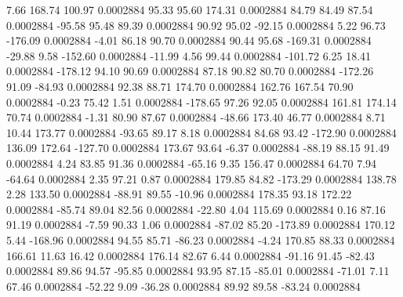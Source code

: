         7.66      168.74      100.97     0.0002884
       95.33       95.60      174.31     0.0002884
       84.79       84.49       87.54     0.0002884
      -95.58       95.48       89.39     0.0002884
       90.92       95.02      -92.15     0.0002884
        5.22       96.73     -176.09     0.0002884
       -4.01       86.18       90.70     0.0002884
       90.44       95.68     -169.31     0.0002884
      -29.88        9.58     -152.60     0.0002884
      -11.99        4.56       99.44     0.0002884
     -101.72        6.25       18.41     0.0002884
     -178.12       94.10       90.69     0.0002884
       87.18       90.82       80.70     0.0002884
     -172.26       91.09      -84.93     0.0002884
       92.38       88.71      174.70     0.0002884
      162.76      167.54       70.90     0.0002884
       -0.23       75.42        1.51     0.0002884
     -178.65       97.26       92.05     0.0002884
      161.81      174.14       70.74     0.0002884
       -1.31       80.90       87.67     0.0002884
      -48.66      173.40       46.77     0.0002884
        8.71       10.44      173.77     0.0002884
      -93.65       89.17        8.18     0.0002884
       84.68       93.42     -172.90     0.0002884
      136.09      172.64     -127.70     0.0002884
      173.67       93.64       -6.37     0.0002884
      -88.19       88.15       91.49     0.0002884
        4.24       83.85       91.36     0.0002884
      -65.16        9.35      156.47     0.0002884
       64.70        7.94      -64.64     0.0002884
        2.35       97.21        0.87     0.0002884
      179.85       84.82     -173.29     0.0002884
      138.78        2.28      133.50     0.0002884
      -88.91       89.55      -10.96     0.0002884
      178.35       93.18      172.22     0.0002884
      -85.74       89.04       82.56     0.0002884
      -22.80        4.04      115.69     0.0002884
        0.16       87.16       91.19     0.0002884
       -7.59       90.33        1.06     0.0002884
      -87.02       85.20     -173.89     0.0002884
      170.12        5.44     -168.96     0.0002884
       94.55       85.71      -86.23     0.0002884
       -4.24      170.85       88.33     0.0002884
      166.61       11.63       16.42     0.0002884
      176.14       82.67        6.44     0.0002884
      -91.16       91.45      -82.43     0.0002884
       89.86       94.57      -95.85     0.0002884
       93.95       87.15      -85.01     0.0002884
      -71.01        7.11       67.46     0.0002884
      -52.22        9.09      -36.28     0.0002884
       89.92       89.58      -83.24     0.0002884
